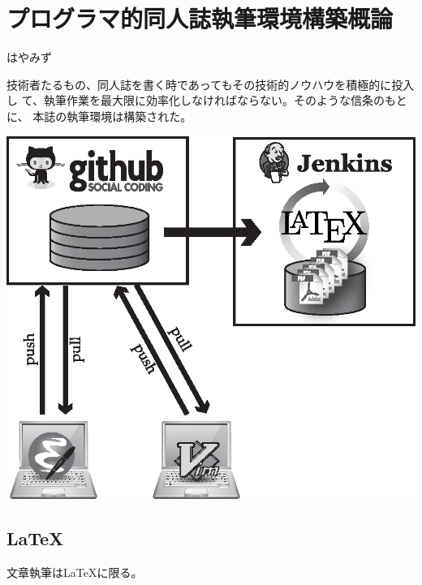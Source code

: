 
\chapter{プログラマ的同人誌執筆環境構築概論}

\begin{flushright}
 はやみず
\end{flushright}

\lettrine{技}
術者たるもの、同人誌を書く時であってもその技術的ノウハウを積極的に投入し
て、執筆作業を最大限に効率化しなければならない。そのような信条のもとに、
本誌の執筆環境は構築された。

\vspace*{3mm}

\begin{center}
 \includegraphics[width=\textwidth]{hayamiz/images/dbtimes-env.eps}
\end{center}

\section{LaTeX}

文章執筆はLaTeXに限る。

